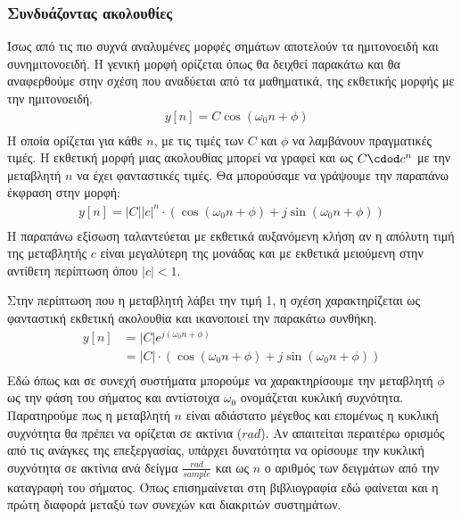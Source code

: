 \documentclass[breaklines=true, 12pt]{article}
\begin{document}
\subsubsection{Συνδυάζοντας ακολουθίες}
\label{sec:orgef238cd}
Ίσως από τις πιο συχνά αναλυμένες μορφές σημάτων αποτελούν  τα
ημιτονοειδή και συνημιτονοειδή. Η γενική μορφή ορίζεται
όπως θα δειχθεί παρακάτω και θα αναφερθούμε στην σχέση που αναδύεται από
τα μαθηματικά, της εκθετικής μορφής με την ημιτονοειδή.
\begin{equation}
\begin{align}
&y[n] = C \cos(\omega_{0}n + \phi) \\
\end{align}
\end{equation}
Η οποία ορίζεται για κάθε \(n\), με τις τιμές των \(C\)
και \(\phi\) να λαμβάνουν πραγματικές τιμές. Η εκθετική μορφή μιας ακολουθίας
μπορεί να γραφεί και ως \(C \cdod c^{n}\) με την μεταβλητή \(n\) να έχει φανταστικές
τιμές. Θα μπορούσαμε να γράψουμε την παραπάνω έκφραση στην μορφή:
\begin{equation}
\begin{align}
y[n] = |C||c|^{n} \cdot(\cos(\omega_{0}n+\phi)+ j\sin(\omega_{0}n+\phi)) \\
\end{align}
\end{equation}
Η παραπάνω εξίσωση ταλαντεύεται με εκθετικά αυξανόμενη κλήση αν η απόλυτη
τιμή της μεταβλητής \(c\) είναι μεγαλύτερη της μονάδας και με εκθετικά
μειούμενη στην αντίθετη περίπτωση όπου \(|c|<1\).

Στην περίπτωση που η μεταβλητή λάβει την τιμή 1, η σχέση χαρακτηρίζεται
ως φανταστική εκθετική ακολουθία και ικανοποιεί την παρακάτω συνθήκη.
\begin{equation}
\begin{align}
y[n] &= |C| e^{j(\omega_{0}n+\phi)} \\
&= |C|\cdot(\cos(\omega_{0}n+\phi)+ j\sin(\omega_{0}n+\phi)) \\
\end{align}
\end{equation}
Εδώ όπως και σε συνεχή συστήματα μπορούμε να χαρακτηρίσουμε την μεταβλητή
\(\phi\) ως την φάση του σήματος και αντίστοιχα \(\omega_{0}\) ονομάζεται κυκλική συχνότητα.
Παρατηρούμε πως η μεταβλητή \(n\) είναι αδιάστατο μέγεθος και επομένως η κυκλική
συχνότητα θα πρέπει να ορίζεται σε ακτίνια (\(rad\)). Αν απαιτείται περαιτέρω
ορισμός από τις ανάγκες της επεξεργασίας, υπάρχει δυνατότητα να ορίσουμε την
κυκλική συχνότητα σε ακτίνια ανά δείγμα \(\displaystyle \frac{rad}{sample}\) και ως \(n\) ο αριθμός των δειγμάτων
από την καταγραφή του σήματος. Όπως επισημαίνεται στη βιβλιογραφία εδώ φαίνεται
και η πρώτη διαφορά μεταξύ των συνεχών και διακριτών συστημάτων.
\end{document}
